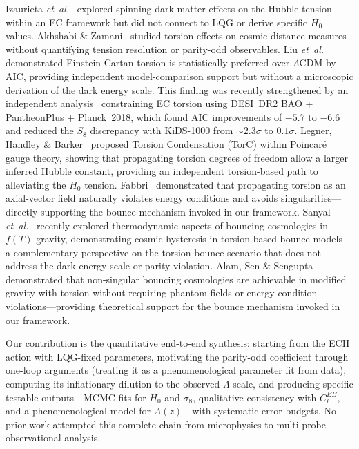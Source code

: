 \documentclass[aps,prd,twocolumn,superscriptaddress,showpacs,preprintnumbers,nofootinbib,longbibliography,floatfix]{revtex4-2}
\newcommand{\etal}{\textit{et~al.}}
\begin{document}
Izaurieta \etal~\cite{Izaurieta2020} explored spinning dark matter effects on the Hubble tension within an EC framework but did not connect to LQG or derive specific $H_0$ values. Akhshabi \& Zamani~\cite{Akhshabi2023} studied torsion effects on cosmic distance measures without quantifying tension resolution or parity-odd observables. Liu \etal~\cite{Liu2025} demonstrated Einstein-Cartan torsion is statistically preferred over $\Lambda$CDM by AIC, providing independent model-comparison support but without a microscopic derivation of the dark energy scale. This finding was recently strengthened by an independent analysis~\cite{ECTorsionDESI2025} constraining EC torsion using DESI~DR2 BAO + PantheonPlus + Planck~2018, which found AIC improvements of $-5.7$ to $-6.6$ and reduced the $S_8$ discrepancy with KiDS-1000 from ${\sim}2.3\sigma$ to $0.1\sigma$. Legner, Handley \& Barker~\cite{Legner2025} proposed Torsion Condensation (TorC) within Poincar\'e gauge theory, showing that propagating torsion degrees of freedom allow a larger inferred Hubble constant, providing an independent torsion-based path to alleviating the $H_0$ tension. Fabbri~\cite{Fabbri2025} demonstrated that propagating torsion as an axial-vector field naturally violates energy conditions and avoids singularities---directly supporting the bounce mechanism invoked in our framework. Sanyal \etal~\cite{Sanyal2026} recently explored thermodynamic aspects of bouncing cosmologies in $f(T)$ gravity, demonstrating cosmic hysteresis in torsion-based bounce models---a complementary perspective on the torsion-bounce scenario that does not address the dark energy scale or parity violation. Alam, Sen \& Sengupta~\cite{Alam2025bounce} demonstrated that non-singular bouncing cosmologies are achievable in modified gravity with torsion without requiring phantom fields or energy condition violations---providing theoretical support for the bounce mechanism invoked in our framework.

Our contribution is the quantitative end-to-end synthesis: starting from the ECH action with LQG-fixed parameters, motivating the parity-odd coefficient through one-loop arguments (treating it as a phenomenological parameter fit from data), computing its inflationary dilution to the observed $\Lambda$ scale, and producing specific testable outputs---MCMC fits for $H_0$ and $\sigma_8$, qualitative consistency with $C_\ell^{EB}$, and a phenomenological model for $A(z)$---with systematic error budgets. No prior work attempted this complete chain from microphysics to multi-probe observational analysis.
\end{document}
